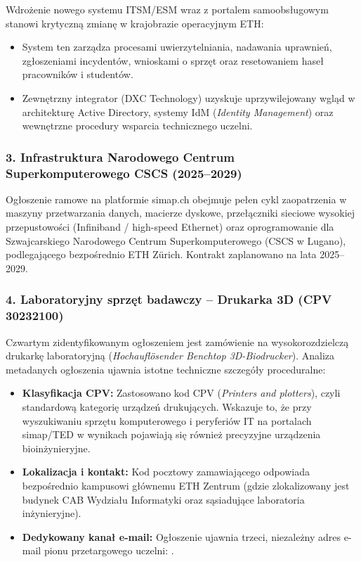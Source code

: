 Wdrożenie nowego systemu ITSM/ESM wraz z portalem samoobsługowym stanowi krytyczną zmianę w krajobrazie operacyjnym ETH:
\begin{itemize}
    \item System ten zarządza procesami uwierzytelniania, nadawania uprawnień, zgłoszeniami incydentów, wnioskami o sprzęt oraz resetowaniem haseł pracowników i studentów.
    \item Zewnętrzny integrator (DXC Technology) uzyskuje uprzywilejowany wgląd w architekturę Active Directory, systemy IdM (\textit{Identity Management}) oraz wewnętrzne procedury wsparcia technicznego uczelni.
\end{itemize}

\subsubsection*{3. Infrastruktura Narodowego Centrum Superkomputerowego CSCS (2025--2029)}

Ogłoszenie ramowe na platformie simap.ch obejmuje pełen cykl zaopatrzenia w maszyny przetwarzania danych, macierze dyskowe, przełączniki sieciowe wysokiej przepustowości (Infiniband / high-speed Ethernet) oraz oprogramowanie dla Szwajcarskiego Narodowego Centrum Superkomputerowego (CSCS w Lugano), podlegającego bezpośrednio ETH Zürich. Kontrakt zaplanowano na lata 2025--2029.


\subsubsection*{4. Laboratoryjny sprzęt badawczy -- Drukarka 3D (CPV 30232100)}

Czwartym zidentyfikowanym ogłoszeniem jest zamówienie na wysokorozdzielczą drukarkę laboratoryjną (\textit{Hochauflösender Benchtop 3D-Biodrucker}). Analiza metadanych ogłoszenia ujawnia istotne techniczne szczegóły proceduralne:
\begin{itemize}
    \item \textbf{Klasyfikacja CPV:} Zastosowano kod CPV  (\textit{Printers and plotters}), czyli standardową kategorię urządzeń drukujących. Wskazuje to, że przy wyszukiwaniu sprzętu komputerowego i peryferiów IT na portalach simap/TED w wynikach pojawiają się również precyzyjne urządzenia bioinżynieryjne.
    \item \textbf{Lokalizacja i kontakt:} Kod pocztowy zamawiającego  odpowiada bezpośrednio kampusowi głównemu ETH Zentrum (gdzie zlokalizowany jest budynek CAB Wydziału Informatyki oraz sąsiadujące laboratoria inżynieryjne).
    \item \textbf{Dedykowany kanał e-mail:} Ogłoszenie ujawnia trzeci, niezależny adres e-mail pionu przetargowego uczelni: .
\end{itemize}

